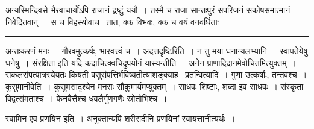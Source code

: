 \documentclass[11pt, openany]{book}
\begin{document}
अन्यस्मिन्दिवसे भैरवाचार्योऽपि राजानं द्रष्टुं ययौ~। तस्मै च राजा सान्तःपुरं सपरिजनं सकोषसमात्मानं निवेदितवान्~। स च विहस्योवाच \textendash\ तात, क्क विभवः, क्क च वयं वनवर्धिताः~।

\vspace{2mm}
\hrule

{\s अन्तःकरणं मनः~। गौरवमुत्कर्षः, भारवत्त्वं च~। {\qtt अदत्तदृष्टिरिति}~। न तु मया धनान्यलभ्यानि~। स्वापतेयेषु धनेषु~। संरक्षिता इति यदि कदाचित्क्वचिदुपयोगं यास्यन्तीति~। अनेन प्राणादिदानमेवोचितमित्युक्तम्~। सकलसंपत्पात्रस्येयतः कियती वसुसंपत्तिर्भविष्यतीत्याशङ्क्याह \textendash\ {\qtt प्रतन्वित्यादि}~। गुणा उत्कर्षाः, तन्तवश्च~। {\qtt कुसुमानीवेति}~। कुसुमसादृश्येन मनसः सौकुमार्यमप्युक्तम्~। साधवः शिष्टाः, शब्दा इव साधवः~। संस्कृता विद्वत्संमताश्च~। फेनवैत्तैश्च धवलैर्गुणगणैः स्रोतोभिश्च~।

{\qtt स्वामिन एव प्रणयिन इति}~। अनुक्तान्यपि शरीरादीनि प्रणयिनां स्वायत्तानीत्यर्थः~।}
\end{document}
